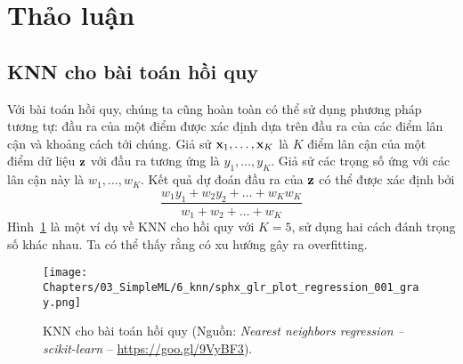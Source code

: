 \section{Thảo luận}



\subsection{KNN cho bài toán hồi quy}
Với bài toán hồi quy, chúng ta cũng hoàn toàn có thể sử dụng phương pháp
tương tự: đầu ra của một điểm được xác định dựa trên đầu ra của các điểm lân cận
và khoảng cách tới chúng. Giả sử $\mathbf{x}_1, \dots, \mathbf{x}_K$ là $K$ điểm lân cận của
một điểm dữ liệu $\mathbf{z}$ với đầu ra tương ứng là $y_1, \dots, y_K$. Giả sử các
trọng số ứng với các lân cận này là $w_1, \dots, w_K$. Kết quả dự đoán
đầu ra của $\mathbf{z}$ có thể được xác định bởi
\begin{equation}
\displaystyle
\frac{w_1 y_1 + w_2 y_2 + \dots + w_Kw_K}{w_1 + w_2 + \dots + w_K}
\end{equation}
Hình~\ref{fig:6_knn_reg} là một ví dụ về KNN cho hồi quy với $K = 5$,
sử dụng hai cách đánh trọng số khác nhau. Ta có thể thấy rằng
 có xu hướng gây ra overfitting.

\begin{figure}[t]
\centering
\texttt{[image: Chapters/03\_SimpleML/6\_knn/sphx\_glr\_plot\_regression\_001\_gray.png]}
\caption[]{KNN cho bài toán hồi quy (Nguồn:
\textit{Nearest neighbors regression -- scikit-learn} -- \url{https://goo.gl/9VyBF3}).}
\label{fig:6_knn_reg}
\end{figure}








